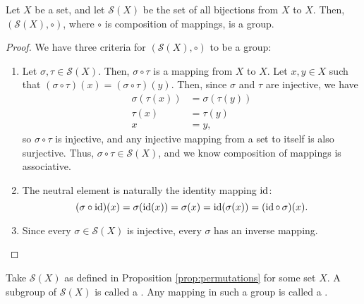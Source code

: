\begin{prop}\label{prop:permutations}
Let $ X $ be a set, and let $ \mathcal{S}(X) $ be the set of all bijections from $ X $ to $ X $. Then, $ (\mathcal{S}(X),\circ) $, where $ \circ $ is composition of mappings, is a group.
\end{prop}
\begin{proof}
We have three criteria for $ (\mathcal{S}(X),\circ) $ to be a group:
\begin{enumerate}
    \item Let $ \sigma,\tau\in\mathcal{S}(X) $. Then, $ \sigma\circ\tau $ is a mapping from $ X $ to $ X $. Let $ x,y\in X $ such that $ (\sigma\circ\tau)(x)=(\sigma\circ\tau)(y) $. Then, since $ \sigma $ and $ \tau $ are injective, we have
    \begin{align*}
        \sigma(\tau(x)) &= \sigma(\tau(y)) \\
        \tau(x) &= \tau(y) \\
        x &= y,
    \end{align*}
    so $ \sigma\circ\tau $ is injective, and any injective mapping from a set to itself is also surjective. Thus, $ \sigma\circ\tau\in\mathcal{S}(X) $, and we know composition of mappings is associative.

    \item The neutral element is naturally the identity mapping $ \operatorname{id} $:
    \begin{equation*}
        (\sigma\circ\operatorname{id})(x)=\sigma(\operatorname{id}(x))=\sigma(x)=\operatorname{id}(\sigma(x))=(\operatorname{id}\circ\,\sigma)(x).
    \end{equation*}

    \item Since every $ \sigma\in\mathcal{S}(X) $ is injective, every $ \sigma $ has an inverse mapping.\qedhere
\end{enumerate}
\end{proof}

\begin{defn}
Take $ \mathcal{S}(X) $ as defined in Proposition \ref{prop:permutations} for some set $ X $. A subgroup of $ \mathcal{S}(X) $ is called a . Any mapping in such a group is called a .
\end{defn}

